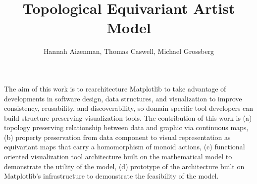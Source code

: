 \documentclass[journal]{vgtc}                %
\title{Topological Equivariant Artist Model}
\author{Hannah Aizenman, Thomas Caswell, Michael Grossberg}
\begin{document}
\linenumbers %

\maketitle
The aim of this work is to rearchitecture Matplotlib to take advantage of developments in software design, data structures, and visualization to improve consistency, reusability, and discoverability, so domain specific tool developers can build structure preserving visualization tools. The contribution of this work is (a) topology preserving relationship between data and graphic via continuous maps, (b) property preservation from data component to visual representation as equivariant maps that carry a homomorphism of monoid actions, (c) functional oriented visualization tool architecture built on the mathematical model to demonstrate the utility of the model, (d) prototype of the architecture built on Matplotlib's infrastructure to demonstrate the feasibility of the model.
\end{document}
